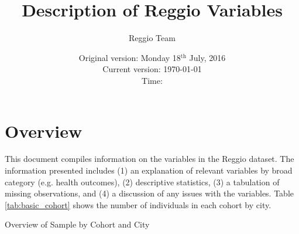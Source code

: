




\title{Description of Reggio Variables}
\author{Reggio Team}
\date{Original version: Monday 18$^{\text{th}}$ July, 2016 \\ Current version: \today \\ \vspace{1em} Time: \currenttime}
\maketitle

\tableofcontents

\doublespace

\section{Overview}
\label{sec:overview}
This document compiles information on the variables in the Reggio dataset. The information presented includes (1) an explanation of relevant variables by broad category (e.g. health outcomes), (2) descriptive statistics, (3) a tabulation of missing observations, and (4) a discussion of any issues with the variables. Table \ref{tab:basic_cohort} shows the number of individuals in each cohort by city.

\begin{table}[htbp]
	\begin{center}
		\caption{Overview of Sample by Cohort and City}\label{tab:basic_cohort}
			
	\end{center}
\end{table}









\singlespace


